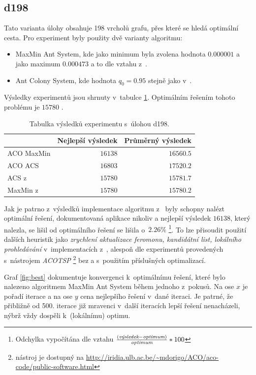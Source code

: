 \documentclass[a4paper, 12pt]{article}
\begin{document}
\subsection{d198}
Tato varianta úlohy obsahuje 198 vrcholů grafu, přes které se hledá optimální cesta. Pro experiment byly použity dvě varianty algoritmu:
\begin{itemize}
  \item MaxMin Ant System, kde jako minimum byla zvolena hodnota $0.000001$ a jako maximum $0.000473$ a to dle vztahu z~\cite{aco:maxmintsp}.
  \item Ant Colony System, kde hodnota $q_0=0.95$ stejně jako v~\cite{aco:acs}.
\end{itemize}
Výsledky experimentů jsou shrnuty v~tabulce \ref{tabd198}. Optimálním řešením tohoto problému je $15 780$ \cite{aco:acs}.
\begin{table}[tb]
\begin{center}
  \begin{tabular}{ | l | r | r |}
   \hline
    & \textbf{Nejlepší výsledek} & \textbf{Průměrný výsledek} \\ \hline \hline
    ACO MaxMin & $16138$ & $16560.5$ \\ \hline
    ACO ACS & $16803$ & $17520.2$ \\ \hline
    ACS z~\cite{aco:acs} & $15 780$ & $15 781.7$ \\ \hline
    MaxMin z~\cite{aco:maxmintsp} & $15 780$ & $15 780.2$\\ \hline
   \end{tabular}
   \caption{Tabulka výsledků experimentu s~úlohou d198.}
   \label{tabd198}
\end{center}
\end{table}
Jak je patrno z~výsledků implementace algoritmu z~\cite{aco:maxmintsp,aco:acs} byly schopny nalézt optimální řešení, dokumentovaná aplikace nikoliv a nejlepší
výsledek $16138$, který nalezla, se lišil
od optimálního řešení se lišila o~$2.26\%$ \footnote{Odchylka vypočítána dle vztahu $\frac{(\emph{výsledek}-\emph{optimum})}{\emph{optimum}}*100$}. To lze
přisoudit použití dalších heuristik jako \emph{zrychlení aktualizace feromonu, kandidátní list, lokálního prohledávání}
v~implementacích z~\cite{aco:maxmintsp,aco:acs}, alespoň dle experimentů provedených s~nástrojem \emph{ACOTSP} \footnote{nástroj je dostupný na
\url{http://iridia.ulb.ac.be/~mdorigo/ACO/aco-code/public-software.html}} bez a s~použitím příslušných optimalizací.

Graf \ref{fig:best} dokumentuje konvergenci k~optimálnímu řešení, které bylo nalezeno algoritmem MaxMin Ant System během jednoho z~pokusů.
Na ose $x$ je pořadí iterace a na ose $y$ cena nejlepšího řešení v~dané iteraci. Je patrné, že přibližně od 500. iterace již mravenci v~další iteracích lepší řešení
nenacházeli, nýbrž vždy dospěli k~(lokálnímu) optimu.
\end{document}
